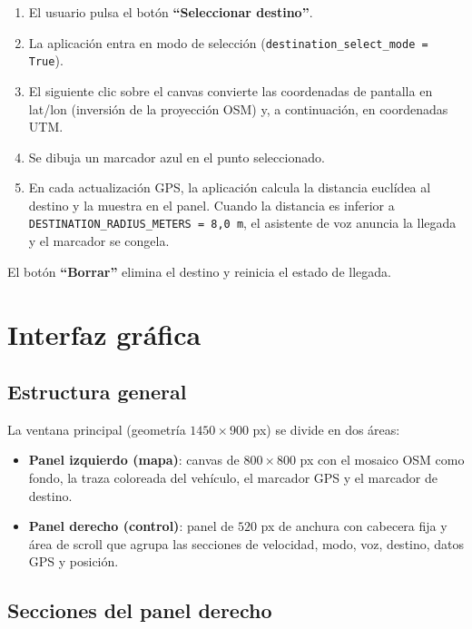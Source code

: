 \documentclass[10pt]{article}
\begin{document}
\begin{enumerate}[leftmargin=1.6em]
    \item El usuario pulsa el botón \textbf{``Seleccionar destino''}.
    \item La aplicación entra en modo de selección (\texttt{destination\_select\_mode = True}).
    \item El siguiente clic sobre el canvas convierte las coordenadas de pantalla en lat/lon (inversión de la proyección OSM) y, a continuación, en coordenadas UTM.
    \item Se dibuja un marcador azul en el punto seleccionado.
    \item En cada actualización GPS, la aplicación calcula la distancia euclídea al destino y la muestra en el panel. Cuando la distancia es inferior a \texttt{DESTINATION\_RADIUS\_METERS = 8{,}0 m}, el asistente de voz anuncia la llegada y el marcador se congela.
\end{enumerate}

El botón \textbf{``Borrar''} elimina el destino y reinicia el estado de llegada.

\section{Interfaz gráfica}

\subsection{Estructura general}

La ventana principal (geometría $1450 \times 900$ px) se divide en dos áreas:

\begin{itemize}[leftmargin=1.2em]
    \item \textbf{Panel izquierdo (mapa)}: canvas de $800 \times 800$ px con el mosaico OSM como fondo, la traza coloreada del vehículo, el marcador GPS y el marcador de destino.
    \item \textbf{Panel derecho (control)}: panel de $520$ px de anchura con cabecera fija y área de scroll que agrupa las secciones de velocidad, modo, voz, destino, datos GPS y posición.
\end{itemize}

\subsection{Secciones del panel derecho}
\end{document}

